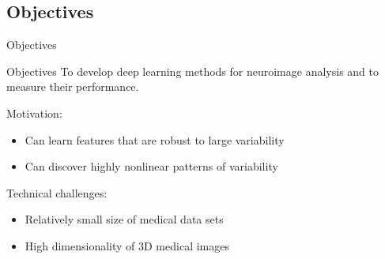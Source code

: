 \documentclass{beamer}
\begin{document}
% 

\subsection*{Objectives}


\begin{frame}{Objectives}
\begin{block}{Objectives}
To develop deep learning methods for neuroimage analysis and to measure their
performance.
\end{block}
\vspace{0.5em}
Motivation:
\begin{itemize}
\item Can learn features that are robust to large variability
\item Can discover highly nonlinear patterns of variability
\end{itemize}
\vspace{0.5em}
Technical challenges:
\begin{itemize}
\item Relatively small size of medical data sets
\item High dimensionality of 3D medical images
\end{itemize}
\end{frame}
\end{document}
